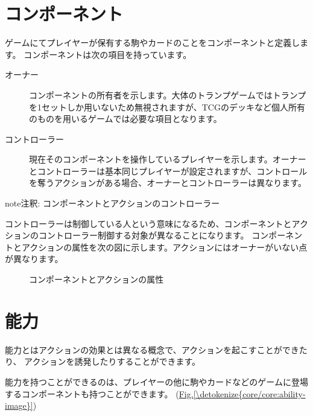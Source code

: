 \documentclass[letterpaper,10pt,dvipdfmx]{sphinxmanual}
\begin{document}
\section{コンポーネント}
\label{\detokenize{core/core:component}}\label{\detokenize{core/core:id12}}
ゲームにてプレイヤーが保有する駒やカードのことをコンポーネントと定義します。
コンポーネントは次の項目を持っています。
\begin{description}
\item[{オーナー}] \leavevmode
コンポーネントの所有者を示します。大体のトランプゲームではトランプを1セットしか用いないため無視されますが、TCGのデッキなど個人所有のものを用いるゲームでは必要な項目となります。

\item[{コントローラー}] \leavevmode
現在そのコンポーネントを操作しているプレイヤーを示します。オーナーとコントローラーは基本同じプレイヤーが設定されますが、コントロールを奪うアクションがある場合、オーナーとコントローラーは異なります。

\end{description}

\begin{sphinxadmonition}{note}{注釈:}
コンポーネントとアクションのコントローラー

コントローラーは制御している人という意味になるため、コンポーネントとアクションのコントローラー制御する対象が異なることになります。
コンポーネントとアクションの属性を次の図に示します。アクションにはオーナーがいない点が異なります。

\begin{figure}[H]
\centering
\capstart

\noindent{}
\caption{コンポーネントとアクションの属性}\label{\detokenize{core/core:id17}}\end{figure}
\end{sphinxadmonition}


\section{能力}
\label{\detokenize{core/core:id13}}
能力とはアクションの効果とは異なる概念で、アクションを起こすことができたり、
アクションを誘発したりすることができます。

能力を持つことができるのは、プレイヤーの他に駒やカードなどのゲームに登場するコンポーネントも持つことができます。
(\hyperref[\detokenize{core/core:ability-image}]{Fig.\@ \ref{\detokenize{core/core:ability-image}}})
\end{document}
